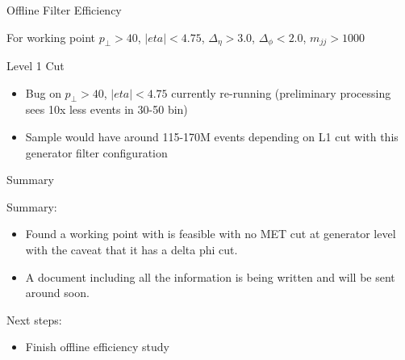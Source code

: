 \documentclass[8pt]{beamer}
\begin{document}
\begin{frame}{Offline Filter Efficiency}

For working point $p_\perp>40$, $|eta|<4.75$, $\Delta_{\eta}>3.0$, $\Delta_{\phi}<2.0$, $m_{jj}>1000$ 

\begin{block}{Level 1 Cut}

  \centering
  
  
\end{block}

\begin{itemize}
  \item Bug on $p_\perp>40$, $|eta|<4.75$ currently re-running (preliminary processing sees 10x less events in 30-50 bin)
  \item Sample would have around 115-170M events depending on L1 cut with this generator filter configuration
\end{itemize}

\end{frame}

\begin{frame}{Summary}
 
\begin{block}{Summary:}
 
\begin{itemize}
  \item Found a working point with is feasible with no MET cut at generator level with the caveat that it has a delta phi cut.
  \item A document including all the information is being written and will be sent around soon.
\end{itemize}

\end{block}

\begin{block}{Next steps:}
 
\begin{itemize}
  \item Finish offline efficiency study
\end{itemize}

\end{block}

\end{frame}
\end{document}
